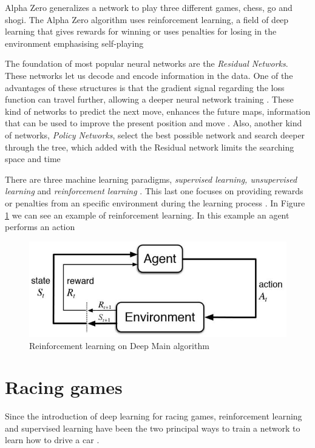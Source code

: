 \documentclass[conference]{IEEEtran}
\begin{document}
Alpha Zero generalizes a network to play three different games, chess, go and shogi. The Alpha Zero algorithm uses reinforcement learning, a field of deep learning that gives rewards for winning or uses penalties for losing in the environment emphasising self-playing \cite{how}

The foundation of most popular neural networks are the \textit{Residual Networks}. These networks let us decode and encode information in the data. One of the advantages of these structures is that the gradient signal regarding the loss function can travel further, allowing a deeper neural network training \cite{how}. These kind of networks to predict the next move, enhances the future maps, information that can be used to improve the present position and move \cite{how}. Also, another kind of networks, \textit{Policy Networks}, select the best possible network and search deeper through the tree, which added with the Residual network limits the searching space and time \cite{how}

There are three machine learning paradigms, \textit{supervised learning, unsupervised learning} and \textit{reinforcement learning} \cite{how}. This last one focuses on providing rewards or penalties from an specific environment during the learning process \cite{how}. In Figure \ref{chess:reinforcement} we can see an example of reinforcement learning. In this example an agent performs an action 

\begin{figure}[h]
\includegraphics[scale=0.5]{img/deepchess}
\caption{Reinforcement learning on Deep Main algorithm \cite{how}}
\label{chess:reinforcement}
\end{figure}

\section{Racing games}

Since the introduction of deep learning for racing games, reinforcement learning and supervised learning have been the two principal ways to train a network to learn how to drive a car \cite{racingpdf}.
\end{document}
